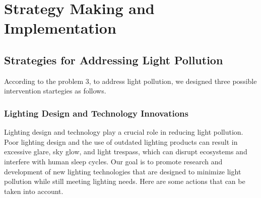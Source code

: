 \MinParskip{}

\section{Strategy Making and Implementation}

\subsection{Strategies for Addressing Light Pollution}

According to the problem 3, to address light pollution, we designed three possible intervention startegies as follows.

\subsubsection{Lighting Design and Technology Innovations}

Lighting design and technology play a crucial role in reducing light pollution. Poor lighting design and the use of outdated lighting products can result in excessive glare, sky glow, and light trespass, which can disrupt ecosystems and interfere with human sleep cycles. Our goal is to promote research and development of new lighting technologies that are designed to minimize light pollution while still meeting lighting needs. Here are some actions that can be taken into account.

